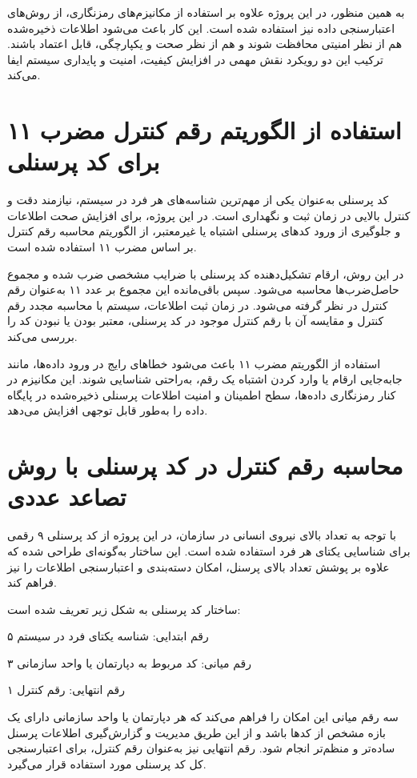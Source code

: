 \documentclass[12pt,a4paper]{report}
\begin{document}
به همین منظور، در این پروژه علاوه بر استفاده از مکانیزم‌های رمزنگاری، از روش‌های اعتبارسنجی داده نیز استفاده شده است. این کار باعث می‌شود اطلاعات ذخیره‌شده هم از نظر امنیتی محافظت شوند و هم از نظر صحت و یکپارچگی، قابل اعتماد باشند. ترکیب این دو رویکرد نقش مهمی در افزایش کیفیت، امنیت و پایداری سیستم ایفا می‌کند.

\section{استفاده از الگوریتم رقم کنترل مضرب ۱۱ برای کد پرسنلی}

کد پرسنلی به‌عنوان یکی از مهم‌ترین شناسه‌های هر فرد در سیستم، نیازمند دقت و کنترل بالایی در زمان ثبت و نگهداری است. در این پروژه، برای افزایش صحت اطلاعات و جلوگیری از ورود کدهای پرسنلی اشتباه یا غیرمعتبر، از الگوریتم محاسبه رقم کنترل بر اساس مضرب ۱۱ استفاده شده است.

در این روش، ارقام تشکیل‌دهنده کد پرسنلی با ضرایب مشخصی ضرب شده و مجموع حاصل‌ضرب‌ها محاسبه می‌شود. سپس باقی‌مانده این مجموع بر عدد ۱۱ به‌عنوان رقم کنترل در نظر گرفته می‌شود. در زمان ثبت اطلاعات، سیستم با محاسبه مجدد رقم کنترل و مقایسه آن با رقم کنترل موجود در کد پرسنلی، معتبر بودن یا نبودن کد را بررسی می‌کند.

استفاده از الگوریتم مضرب ۱۱ باعث می‌شود خطاهای رایج در ورود داده‌ها، مانند جابه‌جایی ارقام یا وارد کردن اشتباه یک رقم، به‌راحتی شناسایی شوند. این مکانیزم در کنار رمزنگاری داده‌ها، سطح اطمینان و امنیت اطلاعات پرسنلی ذخیره‌شده در پایگاه داده را به‌طور قابل توجهی افزایش می‌دهد.
\newpage
\section{  محاسبه رقم کنترل در کد پرسنلی با روش تصاعد عددی}

با توجه به تعداد بالای نیروی انسانی در سازمان، در این پروژه از کد پرسنلی ۹ رقمی برای شناسایی یکتای هر فرد استفاده شده است. این ساختار به‌گونه‌ای طراحی شده که علاوه بر پوشش تعداد بالای پرسنل، امکان دسته‌بندی و اعتبارسنجی اطلاعات را نیز فراهم کند.

ساختار کد پرسنلی به شکل زیر تعریف شده است:

۵ رقم ابتدایی: شناسه یکتای فرد در سیستم

۳ رقم میانی: کد مربوط به دپارتمان یا واحد سازمانی

۱ رقم انتهایی: رقم کنترل 

سه رقم میانی این امکان را فراهم می‌کند که هر دپارتمان یا واحد سازمانی دارای یک بازه مشخص از کدها باشد و از این طریق مدیریت و گزارش‌گیری اطلاعات پرسنل ساده‌تر و منظم‌تر انجام شود. رقم انتهایی نیز به‌عنوان رقم کنترل، برای اعتبارسنجی کل کد پرسنلی مورد استفاده قرار می‌گیرد.
\end{document}
